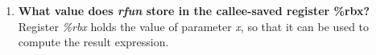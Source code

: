 \documentclass{article}
\begin{document}
\begin{enumerate}[label=\textbf{\Alph*.}]
\item \textbf{What value does \textit{rfun} store in the
callee-saved register \%rbx?} \\
Register \textit{\%rbx} holds the value of parameter \textit{x}, so that it can
be used to compute the result expression.
\end{enumerate}
\end{document}
